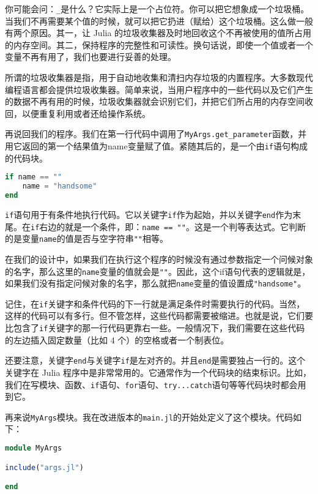 你可能会问：\verb`_`是什么？它实际上是一个占位符。你可以把它想象成一个垃圾桶。当我们不再需要某个值的时候，就可以把它扔进（赋给）这个垃圾桶。这么做一般有两个原因。其一，让 Julia 的垃圾收集器及时地回收这个不再被使用的值所占用的内存空间。其二，保持程序的完整性和可读性。换句话说，即使一个值或者一个变量不再有用了，我们也要进行妥善的处理。

所谓的垃圾收集器是指，用于自动地收集和清扫内存垃圾的内置程序。大多数现代编程语言都会提供垃圾收集器。简单来说，当用户程序中的一些代码以及它们产生的数据不再有用的时候，垃圾收集器就会识别它们，并把它们所占用的内存空间收回，以便重复利用或者还给操作系统。

再说回我们的程序。我们在第一行代码中调用了\verb`MyArgs.get_parameter`函数，并用它返回的第一个结果值为name变量赋了值。紧随其后的，是一个由\verb`if`语句构成的代码块。

\begin{lstlisting}[language=julia]
if name == "" 
    name = "handsome" 
end
\end{lstlisting}

\verb`if`语句用于有条件地执行代码。它以关键字\verb`if`作为起始，并以关键字\verb`end`作为末尾。在\verb`if`右边的就是一个条件，即：\verb`name == ""`。这是一个判等表达式。它判断的是变量\verb`name`的值是否与空字符串\verb`""`相等。

在我们的设计中，如果我们在执行这个程序的时候没有通过参数指定一个问候对象的名字，那么这里的\verb`name`变量的值就会是\verb`""`。因此，这个if语句代表的逻辑就是，如果我们没有指定问候对象的名字，那么就把\verb`name`变量的值设置成\verb`"handsome"`。

记住，在\verb`if`关键字和条件代码的下一行就是满足条件时需要执行的代码。当然，这样的代码可以有多行。但不管怎样，这些代码都需要被缩进。也就是说，它们要比包含了\verb`if`关键字的那一行代码更靠右一些。一般情况下，我们需要在这些代码的左边插入固定数量（比如 4 个）的空格或者一个制表位。

还要注意，关键字\verb`end`与关键字\verb`if`是左对齐的。并且\verb`end`是需要独占一行的。这个关键字在 Julia 程序中是非常常用的。它通常作为一个代码块的结束标识。比如，我们在写模块、函数、\verb`if`语句、\verb`for`语句、\verb`try...catch`语句等等代码块时都会用到它。

再来说\verb`MyArgs`模块。我在改进版本的\verb`main.jl`的开始处定义了这个模块。代码如下：

\begin{lstlisting}[language=julia]
module MyArgs

include("args.jl")

end
\end{lstlisting}

